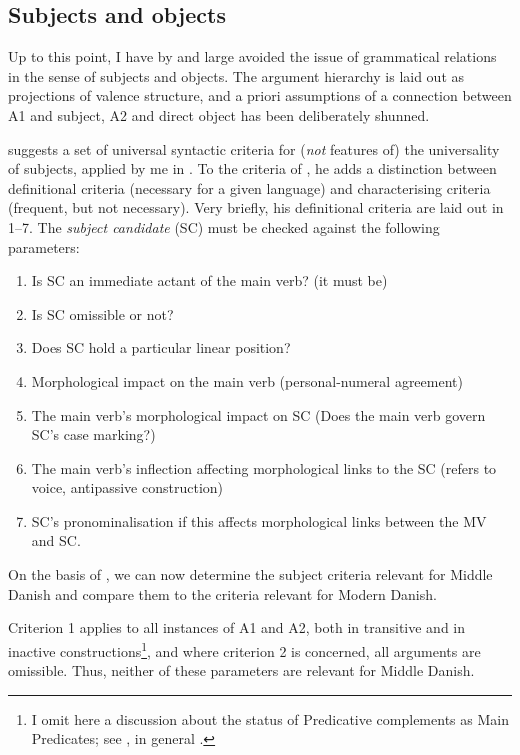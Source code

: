 \documentclass[output=paper]{langscibook}
\begin{document}
\subsection{Subjects and objects} \label{heltoft:3.2}

Up to this point, I have by and large avoided the issue of grammatical relations in the sense of subjects and objects. The argument hierarchy is laid out as projections of valence structure, and a priori assumptions of a connection between A1 and subject, A2 and direct object has been deliberately shunned. 

\citet{Melčuk2014} suggests a set of universal syntactic criteria for (\textit{not} features of) the universality of subjects, applied by me in \citet{Heltoft2021, Heltoft2021b}. To the criteria of \citet{Keenan1976}, he adds a distinction between definitional criteria (necessary for a given language) and characterising criteria (frequent, but not necessary). Very briefly, his definitional criteria are laid out in 1--7. The \textit{subject candidate} (SC) must be checked against the following parameters: 

\begin{enumerate}
    \item Is SC an immediate actant of the main verb? (it must be)
    \item Is SC omissible or not?
    \item Does SC hold a particular linear position?
    \item Morphological impact on the main verb (personal-numeral agreement)
    \item The main verb's morphological impact on SC (Does the main verb govern SC's case marking?)
    \item The main verb's inflection affecting morphological links to the SC (refers to voice, antipassive construction)
    \item SC's pronominalisation if this affects morphological links between the MV and SC.
\end{enumerate}

On the basis of , we can now determine the subject criteria relevant for Middle Danish and compare them to the criteria relevant for Modern Danish. 

  Criterion 1 applies to all instances of A1 and A2, both in transitive and in inactive constructions\footnote{I omit here a discussion about the status of Predicative complements as Main Predicates; see \citet{Heltoft2017}, in general \citet{HansenHeltoft2011}.}, and where criterion 2 is concerned, all arguments are omissible. Thus, neither of these parameters are relevant for Middle Danish. 
\end{document}
